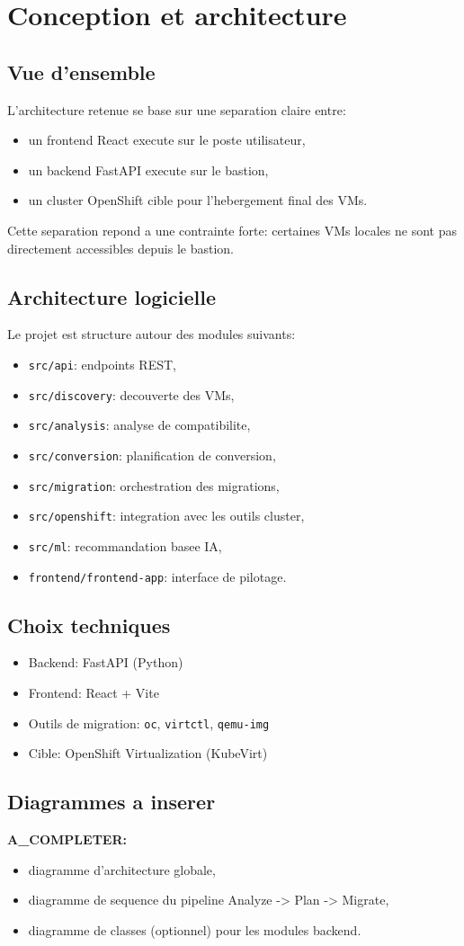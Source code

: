 ﻿\chapter{Conception et architecture}

\section{Vue d'ensemble}
L'architecture retenue se base sur une separation claire entre:
\begin{itemize}[leftmargin=1.2cm]
  \item un frontend React execute sur le poste utilisateur,
  \item un backend FastAPI execute sur le bastion,
  \item un cluster OpenShift cible pour l'hebergement final des VMs.
\end{itemize}

Cette separation repond a une contrainte forte: certaines VMs locales ne sont pas directement accessibles depuis le bastion.

\section{Architecture logicielle}
Le projet est structure autour des modules suivants:
\begin{itemize}[leftmargin=1.2cm]
  \item \texttt{src/api}: endpoints REST,
  \item \texttt{src/discovery}: decouverte des VMs,
  \item \texttt{src/analysis}: analyse de compatibilite,
  \item \texttt{src/conversion}: planification de conversion,
  \item \texttt{src/migration}: orchestration des migrations,
  \item \texttt{src/openshift}: integration avec les outils cluster,
  \item \texttt{src/ml}: recommandation basee IA,
  \item \texttt{frontend/frontend-app}: interface de pilotage.
\end{itemize}

\section{Choix techniques}
\begin{itemize}[leftmargin=1.2cm]
  \item Backend: FastAPI (Python)
  \item Frontend: React + Vite
  \item Outils de migration: \texttt{oc}, \texttt{virtctl}, \texttt{qemu-img}
  \item Cible: OpenShift Virtualization (KubeVirt)
\end{itemize}

\section{Diagrammes a inserer}
\textbf{A_COMPLETER:}
\begin{itemize}[leftmargin=1.2cm]
  \item diagramme d'architecture globale,
  \item diagramme de sequence du pipeline Analyze -> Plan -> Migrate,
  \item diagramme de classes (optionnel) pour les modules backend.
\end{itemize}
